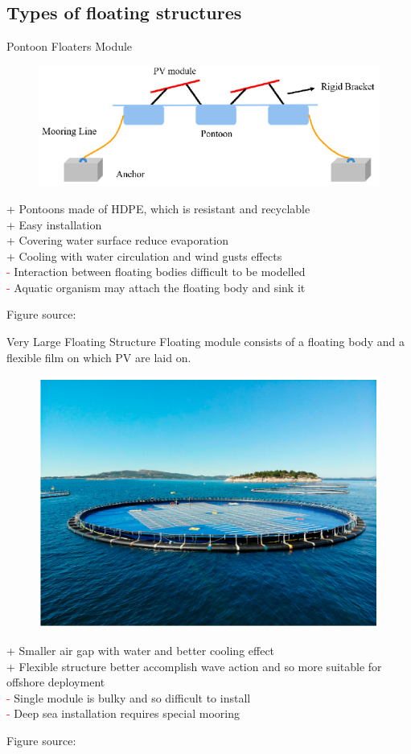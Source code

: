 \documentclass[aspectratio=169, 12pt]{beamer}
\begin{document}
\subsection{Types of floating structures}
\begin{frame}{Pontoon Floaters Module}
  \begin{figure}
    \centering
    \includegraphics[width=0.4\columnwidth]{figure/pontoon.png}
  \end{figure}
  
  \textcolor{NTNUgreen}{+} Pontoons made of HDPE, which is resistant and recyclable\\
  \textcolor{NTNUgreen}{+} Easy installation\\
  \textcolor{NTNUgreen}{+} Covering water surface reduce evaporation\\
  \textcolor{NTNUgreen}{+} Cooling with water circulation and wind gusts effects\\
  \textcolor{red}{-} Interaction between floating bodies difficult to be modelled\\
  \textcolor{red}{-} Aquatic organism may attach the floating body and sink it

  {\tiny Figure source: \cite{jmse11112064}}
\end{frame}

\begin{frame}{Very Large Floating Structure}
  Floating module consists of a floating body and a flexible film on which PV are laid on.
  \begin{figure}
    \centering
    \includegraphics[width=0.3\columnwidth]{figure/vlfs.png}
  \end{figure}

  \textcolor{NTNUgreen}{+} Smaller air gap with water and better cooling effect\\
  \textcolor{NTNUgreen}{+} Flexible structure better accomplish wave action and so more suitable for offshore deployment\\
  \textcolor{red}{-} Single module is bulky and so difficult to install\\
  \textcolor{red}{-} Deep sea installation requires special mooring

  {\tiny Figure source: \cite{jmse11112064}}
\end{frame}
\end{document}

